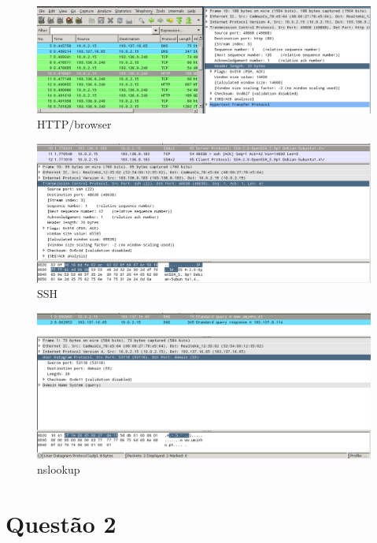 \documentclass[a4paper]{report}
\begin{document}
\begin{figure}[H]
    \centering 
    \includegraphics[width=\textwidth]{images/http_browser.png}  
    \caption{HTTP/browser}
    \label{fig:http_browser}
\end{figure}

\begin{figure}[H]
    \centering 
    \includegraphics[width=\textwidth]{images/ssh.png}  
    \caption{SSH}
    \label{fig:ssh}
\end{figure}

\begin{figure}[H]
    \centering 
    \includegraphics[width=\textwidth]{images/nslookup.png}  
    \caption{nslookup}
    \label{fig:NSLOOKUP}
\end{figure}

\chapter{Questão 2}
\end{document}
